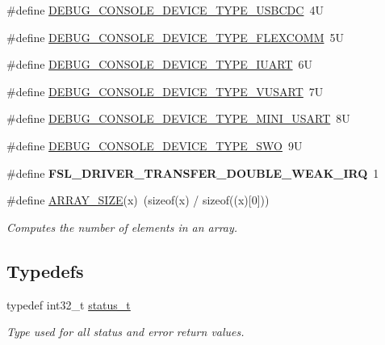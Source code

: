 \begin{DoxyCompactItemize}
\item 
\#define \mbox{\hyperlink{group__ksdk__common_ga262e149f9ce1ef4cf2e539e9494d3cca}{D\+E\+B\+U\+G\+\_\+\+C\+O\+N\+S\+O\+L\+E\+\_\+\+D\+E\+V\+I\+C\+E\+\_\+\+T\+Y\+P\+E\+\_\+\+U\+S\+B\+C\+DC}}~4U
\item 
\#define \mbox{\hyperlink{group__ksdk__common_gad4f7f7e51a84c34f06bbbb34973ae97a}{D\+E\+B\+U\+G\+\_\+\+C\+O\+N\+S\+O\+L\+E\+\_\+\+D\+E\+V\+I\+C\+E\+\_\+\+T\+Y\+P\+E\+\_\+\+F\+L\+E\+X\+C\+O\+MM}}~5U
\item 
\#define \mbox{\hyperlink{group__ksdk__common_ga75a9e86134df04f6a8b66025d11e25c2}{D\+E\+B\+U\+G\+\_\+\+C\+O\+N\+S\+O\+L\+E\+\_\+\+D\+E\+V\+I\+C\+E\+\_\+\+T\+Y\+P\+E\+\_\+\+I\+U\+A\+RT}}~6U
\item 
\#define \mbox{\hyperlink{group__ksdk__common_ga2c85202f838f94e51a0bb7b33856c78d}{D\+E\+B\+U\+G\+\_\+\+C\+O\+N\+S\+O\+L\+E\+\_\+\+D\+E\+V\+I\+C\+E\+\_\+\+T\+Y\+P\+E\+\_\+\+V\+U\+S\+A\+RT}}~7U
\item 
\#define \mbox{\hyperlink{group__ksdk__common_ga5a951951cdb6063d949523052aa5b5e4}{D\+E\+B\+U\+G\+\_\+\+C\+O\+N\+S\+O\+L\+E\+\_\+\+D\+E\+V\+I\+C\+E\+\_\+\+T\+Y\+P\+E\+\_\+\+M\+I\+N\+I\+\_\+\+U\+S\+A\+RT}}~8U
\item 
\#define \mbox{\hyperlink{group__ksdk__common_ga9d142691c3a4d810f8bdabc41e89dfd7}{D\+E\+B\+U\+G\+\_\+\+C\+O\+N\+S\+O\+L\+E\+\_\+\+D\+E\+V\+I\+C\+E\+\_\+\+T\+Y\+P\+E\+\_\+\+S\+WO}}~9U
\item 
\mbox{\label{group__ksdk__common_ga9a10f3f762d9eb7c5db73535db6a9d78}} 
\#define {\bfseries F\+S\+L\+\_\+\+D\+R\+I\+V\+E\+R\+\_\+\+T\+R\+A\+N\+S\+F\+E\+R\+\_\+\+D\+O\+U\+B\+L\+E\+\_\+\+W\+E\+A\+K\+\_\+\+I\+RQ}~1
\item 
\mbox{\label{group__ksdk__common_ga6242a25f9d996f0cc4f4cdb911218b75}} 
\#define \mbox{\hyperlink{group__ksdk__common_ga6242a25f9d996f0cc4f4cdb911218b75}{A\+R\+R\+A\+Y\+\_\+\+S\+I\+ZE}}(x)~(sizeof(x) / sizeof((x)\mbox{[}0\mbox{]}))
\begin{DoxyCompactList}\small\item\em Computes the number of elements in an array. \end{DoxyCompactList}\end{DoxyCompactItemize}
\subsection*{Typedefs}
\begin{DoxyCompactItemize}
\item 
\mbox{\label{group__ksdk__common_gaaabdaf7ee58ca7269bd4bf24efcde092}} 
typedef int32\+\_\+t \mbox{\hyperlink{group__ksdk__common_gaaabdaf7ee58ca7269bd4bf24efcde092}{status\+\_\+t}}
\begin{DoxyCompactList}\small\item\em Type used for all status and error return values. \end{DoxyCompactList}\end{DoxyCompactItemize}
